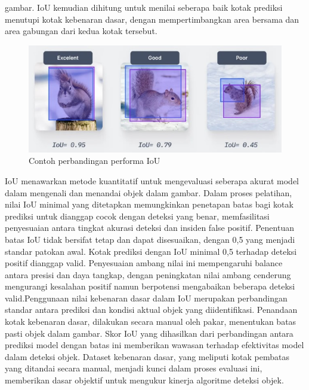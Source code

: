 gambar. IoU kemudian dihitung untuk menilai seberapa baik kotak prediksi menutupi kotak
kebenaran dasar, dengan mempertimbangkan area bersama dan area gabungan dari kedua kotak
tersebut.
\begin{figure} [H] \centering
  \includegraphics[scale=0.6]{gambar/bounding boc.jpg}
  \caption{Contoh perbandingan performa IoU }
  \label{fig:Perbandingan Intersection over Union }
\end{figure}
IoU menawarkan metode kuantitatif untuk mengevaluasi seberapa akurat model dalam
mengenali dan menandai objek dalam gambar. Dalam proses pelatihan, nilai IoU minimal yang
ditetapkan memungkinkan penetapan batas bagi kotak prediksi untuk dianggap cocok dengan
deteksi yang benar, memfasilitasi penyesuaian antara tingkat akurasi deteksi dan insiden false positif. Penentuan batas IoU tidak bersifat tetap dan dapat disesuaikan, dengan 0,5 yang menjadi standar patokan awal. Kotak prediksi dengan IoU minimal 0,5 terhadap deteksi positif dianggap valid. Penyesuaian ambang nilai ini mempengaruhi balance antara presisi dan daya tangkap, dengan peningkatan nilai ambang cenderung mengurangi kesalahan positif namun berpotensi mengabaikan beberapa deteksi valid.Penggunaan nilai kebenaran dasar dalam IoU merupakan perbandingan standar antara prediksi dan kondisi aktual objek yang diidentifikasi. Penandaan kotak kebenaran dasar, dilakukan secara manual oleh pakar, menentukan batas pasti objek dalam gambar. Skor IoU yang dihasilkan dari perbandingan antara prediksi model dengan batas ini memberikan wawasan terhadap efektivitas model dalam deteksi objek. Dataset kebenaran dasar, yang meliputi kotak pembatas yang ditandai secara manual, menjadi kunci dalam proses evaluasi ini, memberikan dasar objektif untuk mengukur kinerja algoritme deteksi objek\cite{Shah2023}.

